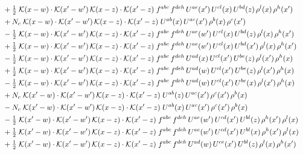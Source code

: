\documentclass[9pt]{article}
\begin{document}
\begin{align}
&\quad +\tfrac{1}{2}\;\mathcal{K}(x-w)\cdot\mathcal{K}(x'-w')\,\mathcal{K}(x-z)\cdot\mathcal{K}(x'-z)\;f^{abc}\,f^{deh}\,U^{ae}(x')\,U^{cl}(x)\,U^{bd}(z)\,\rho^{l}(x)\,\rho^{h}(x')\notag\\
&\quad +N_c\;\mathcal{K}(x-w)\cdot\mathcal{K}(x'-w')\,\mathcal{K}(x-z)\cdot\mathcal{K}(x'-z)\;U^{ab}(x)\,U^{ac}(x')\,\rho^{b}(x)\,\rho^{c}(x')\notag\\
&\quad -\tfrac{1}{2}\;\mathcal{K}(x-w)\cdot\mathcal{K}(x'-w')\,\mathcal{K}(x-z)\cdot\mathcal{K}(x'-z)\;f^{abc}\,f^{deh}\,U^{ae}(w')\,U^{cl}(x)\,U^{bd}(z)\,\rho^{l}(x)\,\rho^{h}(x')\notag\\
&\quad +\tfrac{1}{2}\;\mathcal{K}(x-w)\cdot\mathcal{K}(x'-w')\,\mathcal{K}(x-z)\cdot\mathcal{K}(x'-z)\;f^{abc}\,f^{deh}\,U^{ae}(w')\,U^{cl}(x)\,U^{bd}(x')\,\rho^{l}(x)\,\rho^{h}(x')\notag\\
&\quad -\tfrac{1}{2}\;\mathcal{K}(x-w)\cdot\mathcal{K}(x'-w')\,\mathcal{K}(x-z)\cdot\mathcal{K}(x'-z)\;f^{abc}\,f^{deh}\,U^{ad}(x)\,U^{cl}(x')\,U^{be}(z)\,\rho^{l}(x')\,\rho^{h}(x)\notag\\
&\quad +\tfrac{1}{2}\;\mathcal{K}(x-w)\cdot\mathcal{K}(x'-w')\,\mathcal{K}(x-z)\cdot\mathcal{K}(x'-z)\;f^{abc}\,f^{deh}\,U^{ad}(w)\,U^{cl}(x')\,U^{be}(z)\,\rho^{l}(x')\,\rho^{h}(x)\notag\\
&\quad -\tfrac{1}{2}\;\mathcal{K}(x-w)\cdot\mathcal{K}(x'-w')\,\mathcal{K}(x-z)\cdot\mathcal{K}(x'-z)\;f^{abc}\,f^{deh}\,U^{ad}(w)\,U^{cl}(x')\,U^{be}(x)\,\rho^{l}(x')\,\rho^{h}(x)\notag\\
&\quad +N_c\;\mathcal{K}(x'-w)\cdot\mathcal{K}(x'-w')\,\mathcal{K}(x-z)\cdot\mathcal{K}(x'-z)\;U^{ab}(z)\,U^{ac}(x')\,\rho^{c}(x')\,\rho^{b}(x)\notag\\
&\quad -N_c\;\mathcal{K}(x'-w)\cdot\mathcal{K}(x'-w')\,\mathcal{K}(x-z)\cdot\mathcal{K}(x'-z)\;U^{ab}(x)\,U^{ac}(x')\,\rho^{c}(x')\,\rho^{b}(x)\notag\\
&\quad -\tfrac{1}{2}\;\mathcal{K}(x'-w)\cdot\mathcal{K}(x'-w')\,\mathcal{K}(x-z)\cdot\mathcal{K}(x'-z)\;f^{abc}\,f^{deh}\,U^{ae}(w')\,U^{cd}(x')\,U^{bl}(z)\,\rho^{h}(x')\,\rho^{l}(x)\notag\\
&\quad +\tfrac{1}{2}\;\mathcal{K}(x'-w)\cdot\mathcal{K}(x'-w')\,\mathcal{K}(x-z)\cdot\mathcal{K}(x'-z)\;f^{abc}\,f^{deh}\,U^{ae}(w')\,U^{cd}(x')\,U^{bl}(x)\,\rho^{h}(x')\,\rho^{l}(x)\notag\\
&\quad +\tfrac{1}{2}\;\mathcal{K}(x'-w)\cdot\mathcal{K}(x'-w')\,\mathcal{K}(x-z)\cdot\mathcal{K}(x'-z)\;f^{abc}\,f^{deh}\,U^{ad}(w)\,U^{ce}(x')\,U^{bl}(z)\,\rho^{l}(x)\,\rho^{h}(x')\notag\\

\end{align}
\end{document}
